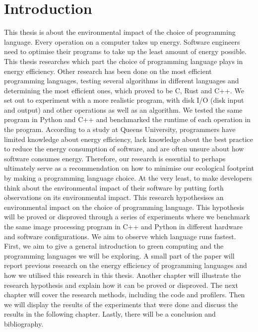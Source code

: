 \chapter{Introduction}
This thesis is about the environmental impact of the choice of programming language. Every operation on a computer takes up energy. Software engineers need to optimise their programs to take up the least amount of energy possible. This thesis researches which part the choice of programming language plays in energy efficiency.
Other research has been done on the most efficient programming languages, testing several algorithms in different languages and determining the most efficient ones, which proved to be C, Rust and C++. We set out to experiment with a more realistic program, with disk I/O (disk input and output) and other operations as well as an algorithm. We tested the same program in Python and C++ and benchmarked the runtime of each operation in the program.
According to a study at Queens University, programmers have limited knowledge about energy efficiency, lack knowledge about the best practice to reduce the energy consumption of software, and are often unsure about how software consumes energy.
Therefore, our research is essential to perhaps ultimately serve as a recommendation on how to minimise our ecological footprint by making a programming language choice. At the very least, to make developers think about the environmental impact of their software by putting forth observations on its environmental impact.
This research hypothesises an environmental impact on the choice of programming language. This hypothesis will be proved or disproved through a series of experiments where we benchmark the same image processing program in C++ and Python in different hardware and software configurations. We aim to observe which language runs fastest.
First, we aim to give a general introduction to green computing and the programming languages we will be exploring. A small part of the paper will report previous research on the energy efficiency of programming languages and how we utilised this research in this thesis. Another chapter will illustrate the research hypothesis and explain how it can be proved or disproved. The next chapter will cover the research methods, including the code and profilers. Then we will display the results of the experiments that were done and discuss the results in the following chapter. Lastly, there will be a conclusion and bibliography.
